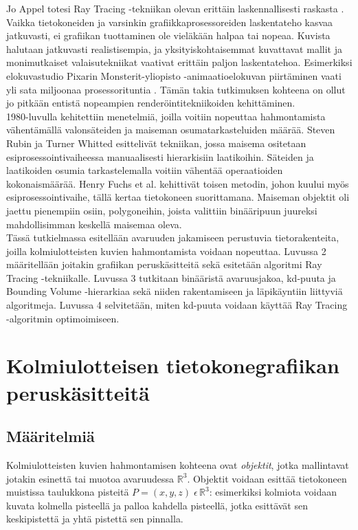 ﻿\documentclass[a4paper,12pt, titlepage]{article}
\newcommand{\R}{\mathbb{R}}
\begin{document}
Jo Appel totesi Ray Tracing -tekniikan olevan erittäin laskennallisesti raskasta \citep{appel}. Vaikka tietokoneiden ja varsinkin grafiikkaprosessoreiden laskentateho kasvaa jatkuvasti, ei grafiikan tuottaminen ole vieläkään halpaa tai nopeaa. Kuvista halutaan jatkuvasti realistisempia, ja yksityiskohtaisemmat kuvattavat mallit ja monimutkaiset valaisutekniikat vaativat erittäin paljon laskentatehoa. Esimerkiksi elokuvastudio Pixarin Monsterit-yliopisto -animaatioelokuvan piirtäminen vaati yli sata miljoonaa prosessorituntia \citep{monsterit}. Tämän takia tutkimuksen kohteena on ollut jo pitkään entistä nopeampien renderöintitekniikoiden kehittäminen.\\

1980-luvulla kehitettiin menetelmiä, joilla voitiin nopeuttaa hahmontamista vähentämällä valonsäteiden ja maiseman osumatarkasteluiden määrää. Steven Rubin ja Turner Whitted esittelivät tekniikan, jossa maisema ositetaan esiprosessointivaiheessa manuaalisesti hierarkisiin laatikoihin. Säteiden ja laatikoiden osumia tarkastelemalla voitiin vähentää operaatioiden kokonaismäärää. \citep[.]{rubin} Henry Fuchs et al. kehittivät toisen metodin, johon kuului myös esiprosessointivaihe, tällä kertaa tietokoneen suorittamana. Maiseman objektit oli jaettu pienempiin osiin, polygoneihin, joista valittiin binääripuun juureksi mahdollisimman keskellä maisemaa oleva.\\

Tässä tutkielmassa esitellään avaruuden jakamiseen perustuvia tietorakenteita, joilla kolmiulotteisten kuvien hahmontamista voidaan nopeuttaa. Luvussa 2 määritellään joitakin grafiikan peruskäsitteitä sekä esitetään algoritmi Ray Tracing -tekniikalle. Luvussa 3 tutkitaan binääristä avaruusjakoa, kd-puuta ja Bounding Volume -hierarkiaa sekä niiden rakentamiseen ja läpikäyntiin liittyviä algoritmeja. Luvussa 4 selvitetään, miten kd-puuta voidaan käyttää Ray Tracing -algoritmin optimoimiseen.


\newpage
\section{Kolmiulotteisen tietokonegrafiikan peruskäsitteitä}
\subsection{Määritelmiä}

Kolmiulotteisten kuvien hahmontamisen kohteena ovat \emph{objektit}, jotka mallintavat jotakin esinettä tai muotoa avaruudessa $\R^3$. Objektit voidaan esittää tietokoneen muistissa taulukkona pisteitä $P=(x,y,z)\;\epsilon\,\R^3$: esimerkiksi kolmiota voidaan kuvata kolmella pisteellä ja palloa kahdella pisteellä, jotka esittävät sen keskipistettä ja yhtä pistettä sen pinnalla. \citep[.]{angel}\\
\end{document}
